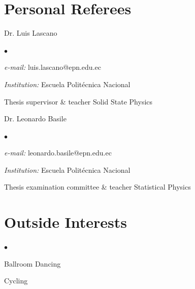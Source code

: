 \documentclass[margin,line]{res}
\newenvironment{list1}{
  \begin{list}{\ding{113}}{%
      \setlength{\itemsep}{0in}
      \setlength{\parsep}{0in} \setlength{\parskip}{0in}
      \setlength{\topsep}{0in} \setlength{\partopsep}{0in} 
      \setlength{\leftmargin}{0.17in}}}{\end{list}}
\newenvironment{list2}{
  \begin{list}{$\bullet$}{%
      \setlength{\itemsep}{0in}
      \setlength{\parsep}{0in} \setlength{\parskip}{0in}
      \setlength{\topsep}{0in} \setlength{\partopsep}{0in} 
      \setlength{\leftmargin}{0.2in}}}{\end{list}}
\begin{document}
\begin{resume}
\section{\sc Personal Referees}
 \begin{list1}
  \item[] Dr. Luis Lascano
  \begin{list2}
   \item {\it e-mail:} luis.lascano@epn.edu.ec
   \item {\it Institution:} Escuela Politécnica Nacional
   \item Thesis supervisor \& teacher Solid State Physics
  \end{list2}
 \end{list1}
 \begin{list1}
  \item[] Dr. Leonardo Basile
  \begin{list2}
   \item {\it e-mail:} leonardo.basile@epn.edu.ec
   \item {\it Institution:} Escuela Politécnica Nacional
   \item Thesis examination committee \& teacher Statistical Physics
  \end{list2}
 \end{list1}


\section{\sc Outside Interests}
 \begin{list2}
  \item Ballroom Dancing
  \item Cycling
 \end{list2}

\end{resume}
\end{document}
